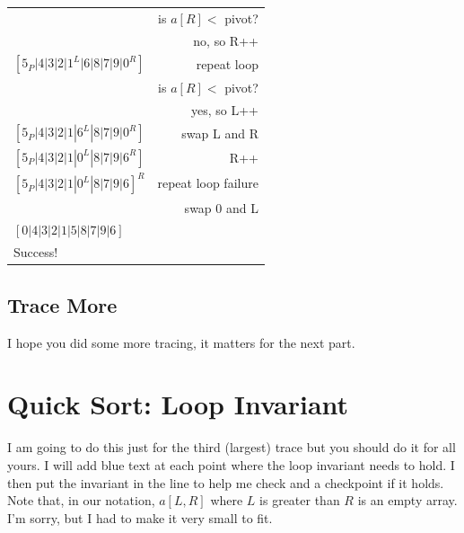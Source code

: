 \documentclass[twoside=false,DIV=14]{scrartcl}
\newcommand{\swaplr}{swap L and R}
\newcommand{\nrpp}{no, so R++}
\newcommand{\ylpp}{yes, so L++}
\newcommand{\isrp}{is $a[R] <$ pivot? }
\begin{document}
\begin{tabular}{lr}
    & \isrp \\
    & \nrpp \\
    $[5_P|4|3|2|1^L|6|8|7|9|0^R]$   & repeat loop \\
    & \isrp \\
    & \ylpp \\
    $[5_P|4|3|2|1|6^L|8|7|9|0^R]$   & \swaplr \\
    $[5_P|4|3|2|1|0^L|8|7|9|6^R]$   & R++ \\
    $[5_P|4|3|2|1|0^L|8|7|9|6]^R$   & repeat loop failure \\
    & swap 0 and L \\
    $[0|4|3|2|1|5|8|7|9|6]$ & \\
    Success! & \\
\end{tabular}

\subsection{Trace More}
I hope you did some more tracing, it matters for the next part.

\section{Quick Sort: Loop Invariant}
I am going to do this just for the third (largest) trace but you should do it for all yours.  I will add blue text at each point where the loop invariant needs to hold.  I then put the invariant in the line to help me check and a checkpoint if it holds.  Note that, in our notation, $a[L,R]$ where $L$ is greater than $R$ is an empty array.  I'm sorry, but I had to make it very small to fit.
\vspace{2em}
\end{document}
